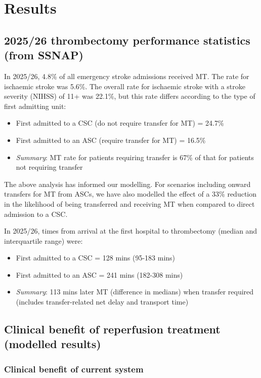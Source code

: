 \section{Results}

\subsection{2025/26 thrombectomy performance statistics (from SSNAP)}

In 2025/26, 4.8\% of all emergency stroke admissions received MT. The rate for ischaemic stroke was 5.6\%. The overall rate for ischaemic stroke with a stroke severity (NIHSS) of 11+ was 22.1\%, but this rate differs according to the type of first admitting unit:

\begin{itemize}
    \item First admitted to a CSC (do not require transfer for MT) = 24.7\%
    \item First admitted to an ASC (require transfer for MT) = 16.5\%
    \item \textit{Summary}: MT rate for patients requiring transfer is 67\% of that for patients not requiring transfer
\end{itemize}

The above analysis has informed our modelling. For scenarios including onward transfers for MT from ASCs, we have also modelled the effect of a 33\% reduction in the likelihood of being transferred and receiving MT when compared to direct admission to a CSC.

In 2025/26, times from arrival at the first hospital to thrombectomy (median and interquartile range) were:

\begin{itemize}
    \item First admitted to a CSC = 128 mins (95-183 mins)
    \item First admitted to an ASC = 241 mins (182-308 mins)
    \item \textit{Summary}: 113 mins later MT (difference in medians) when transfer required (includes transfer-related net delay and transport time)
\end{itemize}

\subsection{Clinical benefit of reperfusion treatment (modelled results)}

\subsubsection{Clinical benefit of current system}

